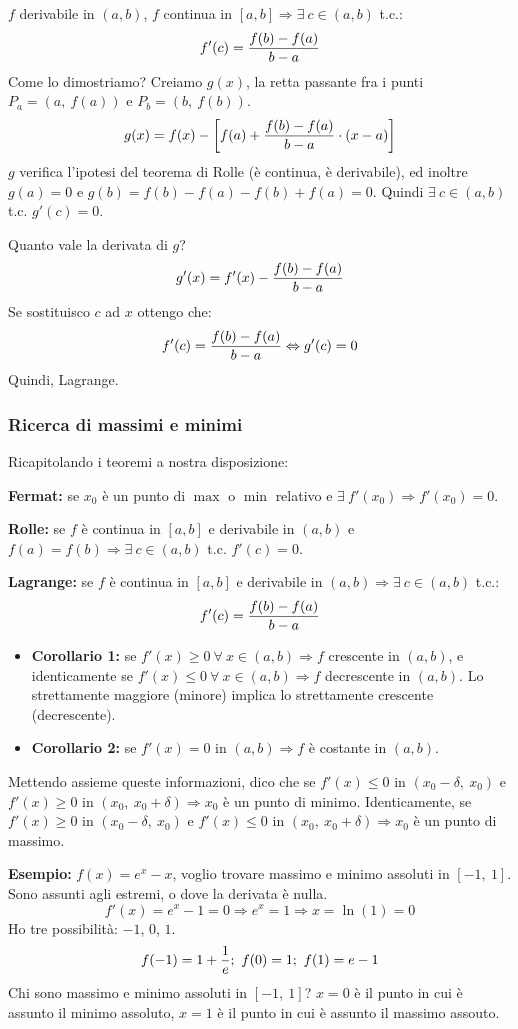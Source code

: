 \documentclass[12pt,a4paper]{article}
\begin{document}
$f$ derivabile in $(a,b)$, $f$ continua in $[a,b] \Rightarrow \exists \ c \in
(a,b)$ t.c.:
$$ f'(c) = {f(b) - f(a) \over b - a} $$
Come lo dimostriamo? Creiamo $g(x)$, la retta passante fra i punti $P_a = 
(a, \ f(a))$ e $P_b = (b, \ f(b))$.
$$
g(x) = f(x) - \left[ f(a) + {f(b) - f(a) \over b - a} \cdot (x - a) \right]
$$
$g$ verifica l'ipotesi del teorema di Rolle (\`e continua, \`e derivabile),
ed inoltre $g(a) = 0$ e $g(b) = f(b) - f(a) - f(b) + f(a) = 0$. Quindi
$ \exists \ c \in (a,b)$ t.c. $g'(c) = 0$.

Quanto vale la derivata di $g$?
$$
g'(x) = f'(x) - {f(b) - f(a) \over b - a}
$$
Se sostituisco $c$ ad $x$ ottengo che:
$$
f'(c) = {f(b) - f(a) \over b - a} \Leftrightarrow g'(c) = 0
$$
Quindi, Lagrange.

\subsubsection{Ricerca di massimi e minimi}
Ricapitolando i teoremi a nostra disposizione:

\textbf{Fermat:} se $x_0$ \`e un punto di $\max$ o $\min$ relativo e $\exists 
\ f'(x_0) \Rightarrow f'(x_0) = 0$.

\textbf{Rolle:} se $f$ \`e continua in $[a,b]$ e derivabile in $(a,b)$ e
$f(a) = f(b) \Rightarrow \exists \ c \in (a,b)$ t.c. $f'(c) = 0$.

\textbf{Lagrange:} se $f$ \`e continua in $[a,b]$ e derivabile in $(a,b) 
\Rightarrow \exists \ c \in (a,b)$ t.c.:
$$ f'(c) = {f(b) - f(a) \over b - a} $$
\begin{itemize}
\item \textbf{Corollario 1:} se $f'(x) \geq 0 \ \forall \ x \in (a,b) 
\Rightarrow f$ crescente in $(a,b)$, e identicamente se $f'(x) \leq 0 
\ \forall \ x \in (a,b) \Rightarrow f$ decrescente in $(a,b)$.
Lo strettamente maggiore (minore) implica lo strettamente crescente
(decrescente).
\item \textbf{Corollario 2:} se $f'(x) = 0$ in $(a,b) \Rightarrow f$ 
\`e costante in $(a,b)$.
\end{itemize}

Mettendo assieme queste informazioni, dico che se $f'(x) \leq 0$ in
$(x_0 - \delta, \ x_0)$ e $f'(x) \geq 0$ in $(x_0, \ x_0 + \delta)
\Rightarrow x_0$ \`e un punto di minimo. Identicamente, se $f'(x) \geq 0$ 
in $(x_0 - \delta, \ x_0)$ e $f'(x) \leq 0$ in $(x_0, \ x_0 + \delta)
\Rightarrow x_0$ \`e un punto di massimo.

\textbf{Esempio:} $f(x) = e^x - x$, voglio trovare massimo e minimo
assoluti in $[-1,\ 1]$. Sono assunti agli estremi, o dove la derivata
\`e nulla.
$$
f'(x) = e^x - 1 = 0 \Rightarrow e^x = 1 \Rightarrow x = \ln(1) = 0
$$
Ho tre possibilit\`a: $-1$, $0$, $1$.
$$
f(-1) = 1 + {1 \over e} ; \ f(0) = 1 ; \ f(1) = e - 1
$$
Chi sono massimo e minimo assoluti in $[-1, \ 1]$? $x=0$ \`e il punto 
in cui \`e assunto il minimo assoluto, $x=1$ \`e il punto in cui \`e
assunto il massimo assouto.
\end{document}
